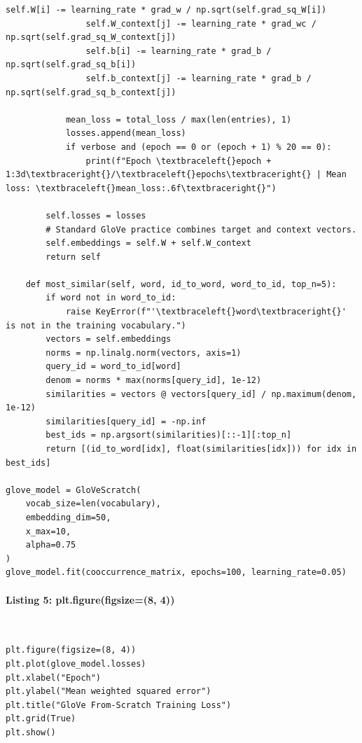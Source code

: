 \documentclass[12pt,a4paper,oneside]{report}
\begin{document}
\begin{Verbatim}[commandchars=\\\{\},breaklines=true,breakanywhere=true,fontsize=\scriptsize,frame=leftline,framesep=2mm,rulecolor=\color{gray}]
                self.W[i] -= learning_rate * grad_w / np.sqrt(self.grad_sq_W[i])
                self.W_context[j] -= learning_rate * grad_wc / np.sqrt(self.grad_sq_W_context[j])
                self.b[i] -= learning_rate * grad_b / np.sqrt(self.grad_sq_b[i])
                self.b_context[j] -= learning_rate * grad_b / np.sqrt(self.grad_sq_b_context[j])

            mean_loss = total_loss / max(len(entries), 1)
            losses.append(mean_loss)
            if verbose and (epoch == 0 or (epoch + 1) % 20 == 0):
                print(f"Epoch \textbraceleft{}epoch + 1:3d\textbraceright{}/\textbraceleft{}epochs\textbraceright{} | Mean loss: \textbraceleft{}mean_loss:.6f\textbraceright{}")

        self.losses = losses
        # Standard GloVe practice combines target and context vectors.
        self.embeddings = self.W + self.W_context
        return self

    def most_similar(self, word, id_to_word, word_to_id, top_n=5):
        if word not in word_to_id:
            raise KeyError(f"'\textbraceleft{}word\textbraceright{}' is not in the training vocabulary.")
        vectors = self.embeddings
        norms = np.linalg.norm(vectors, axis=1)
        query_id = word_to_id[word]
        denom = norms * max(norms[query_id], 1e-12)
        similarities = vectors @ vectors[query_id] / np.maximum(denom, 1e-12)
        similarities[query_id] = -np.inf
        best_ids = np.argsort(similarities)[::-1][:top_n]
        return [(id_to_word[idx], float(similarities[idx])) for idx in best_ids]

glove_model = GloVeScratch(
    vocab_size=len(vocabulary),
    embedding_dim=50,
    x_max=10,
    alpha=0.75
)
glove_model.fit(cooccurrence_matrix, epochs=100, learning_rate=0.05)
\end{Verbatim}
\paragraph{Listing 5: plt.figure(figsize=(8, 4))}\mbox{}\\[-1ex]
\begin{Verbatim}[commandchars=\\\{\},breaklines=true,breakanywhere=true,fontsize=\scriptsize,frame=leftline,framesep=2mm,rulecolor=\color{gray}]
plt.figure(figsize=(8, 4))
plt.plot(glove_model.losses)
plt.xlabel("Epoch")
plt.ylabel("Mean weighted squared error")
plt.title("GloVe From-Scratch Training Loss")
plt.grid(True)
plt.show()
\end{Verbatim}
\end{document}
